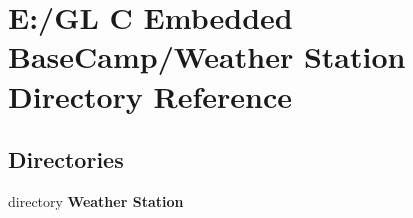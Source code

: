 \section{E\+:/\+GL C Embedded Base\+Camp/\+Weather Station Directory Reference}
\label{dir_5a861a8f5fd0fa00b0c4b82b259f5546}
\subsection*{Directories}
\begin{DoxyCompactItemize}
\item 
directory \textbf{ Weather Station}
\end{DoxyCompactItemize}
